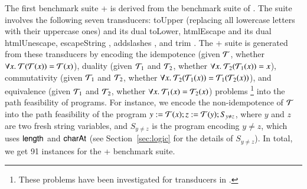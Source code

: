 The first benchmark suite {\transducerbench+} is derived from the {\transducerbench} benchmark suite of {\ostrich} \cite{CHL+19}.  The {\transducerbench} suite involves the following seven transducers: toUpper (replacing all lowercase letters with their uppercase ones) and its dual toLower, htmlEscape \cite{htmlEscape} and its dual htmlUnescape, escapeString \cite{escapeString}, addslashes \cite{addslashes}, and trim \cite{trim}. The {\transducerbench+} suite is generated from these transducers by encoding the idempotence (given $\mathcal{T}$, whether $\forall x.\ \mathcal{T}(\mathcal{T}(x)) = \mathcal{T}(x)$), duality (given $\mathcal{T}_1$ and $\mathcal{T}_2$, whether $\forall x.\ \mathcal{T}_2(\mathcal{T}_1(x)) = x$), commutativity (given $\mathcal{T}_1$ and $\mathcal{T}_2$, whether $\forall x.\ \mathcal{T}_2(\mathcal{T}_1(x)) = \mathcal{T}_1(\mathcal{T}_2(x))$), and equivalence (given $\mathcal{T}_1$ and $\mathcal{T}_2$, whether $\forall x.\ \mathcal{T}_1(x) = \mathcal{T}_2(x)$) problems \footnote{These problems have been investigated for transducers in \cite{BEK}.} into the path feasibility of {\slint} programs. For instance, we encode the non-idempotence of $\mathcal{T}$ into the path feasibility of the {\slint} program $y:=\mathcal{T}(x); z:=\mathcal{T}(y); S_{y \neq z}$, where $y$ and $z$ are two fresh string variables, and $S_{y \neq z}$ is the {\slint} program encoding $y \neq z$, which uses $\mathsf{length}$ and $\mathsf{charAt}$ (see Section~\ref{sec:logic} for the details of $S_{y \neq z}$). In total, we get 91 instances for the {\transducerbench+} benchmark suite. 
%
%
%
%

